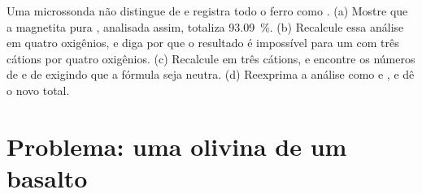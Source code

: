 \begin{exercise}[$\star\star\star$]\label{exo:b1:rock-forming-minerals:12}
Uma microssonda não distingue  de  e registra todo o ferro como . (a) Mostre que a magnetita pura , analisada assim, totaliza \qty{93.09}{\percent}. (b) Recalcule essa análise em quatro oxigênios, e diga por que o resultado é impossível para um  com três cátions por quatro oxigênios. (c) Recalcule em três cátions, e encontre os números de  e de  exigindo que a fórmula seja neutra. (d) Reexprima a análise como  e , e dê o novo total.
\end{exercise}

\section{Problema: uma olivina de um basalto}

